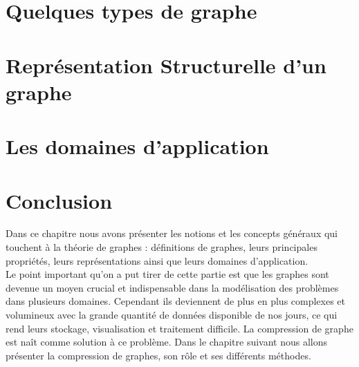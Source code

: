 	\section{Quelques types de graphe}
			
	
	
    		
    	\section{Représentation Structurelle d'un graphe}	
		
	
	\section{Les domaines d'application}
			
		
	
	
			
	\section{Conclusion}
Dans ce chapitre nous avons présenter les notions et les concepts généraux qui touchent à la théorie de graphes : définitions de graphes, leurs principales propriétés, leurs représentations ainsi que leurs domaines d'application.\\
Le point important qu'on a put tirer de cette partie est que les graphes sont devenue un moyen crucial et indispensable dans la modélisation des problèmes dans plusieurs domaines. Cependant ils deviennent de plus en plus complexes et volumineux avec la grande quantité de données disponible de nos jours, ce qui rend leurs stockage, visualisation et traitement difficile. La compression de graphe est naît comme solution à ce problème. Dans le chapitre suivant nous allons présenter la compression de graphes, son rôle et ses différents méthodes.  
	
	